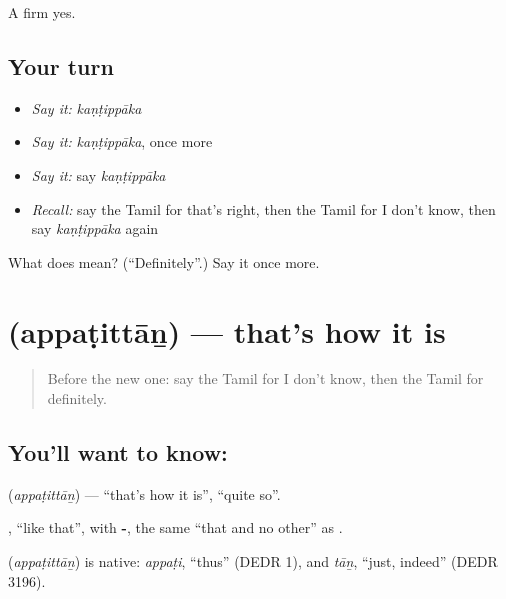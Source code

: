 \begin{grammarlens}[title={What you've built}]
A firm yes.
\end{grammarlens}

\subsection*{Your turn}
\begin{itemize}
\raggedright
  \item \emph{Say it:} \emph{kaṇṭippāka}
  \item \emph{Say it:} \emph{kaṇṭippāka}, once more
  \item \emph{Say it:} say \emph{kaṇṭippāka}
  \item \emph{Recall:} say the Tamil for that's right, then the Tamil for I don't know, then say \emph{kaṇṭippāka} again
\end{itemize}

\begin{tcolorbox}[breakable,colback=teal!4,colframe=teal!35!black,title={Before you move on}]
What does  mean? (\textquotedblleft{}Definitely\textquotedblright{}.) Say it once more.
\end{tcolorbox}
\section[\texorpdfstring{\ta{அப்படித்தான்} (appaṭittāṉ)}{அப்படித்தான் (appaṭittāṉ)}]{ (appaṭittāṉ) — that's how it is}

\label{lesson:TA-C97-thatshow}



\begin{quote}
Before the new one: say the Tamil for I don't know, then the Tamil for definitely.
\end{quote}

\subsection*{You'll want to know: }
\textbf{} (\emph{appaṭittāṉ}) — \textquotedblleft{}that's how it is\textquotedblright{}, \textquotedblleft{}quite so\textquotedblright{}.

\textbf{}, \textquotedblleft{}like that\textquotedblright{}, with \textbf{-}, the same \textquotedblleft{}that and no other\textquotedblright{} as \textbf{}.

\begin{cousinweb}
\textbf{} (\emph{appaṭittāṉ}) is native: \emph{appaṭi}, \textquotedblleft{}thus\textquotedblright{} (DEDR 1), and \emph{tāṉ}, \textquotedblleft{}just, indeed\textquotedblright{} (DEDR 3196).
\end{cousinweb}

